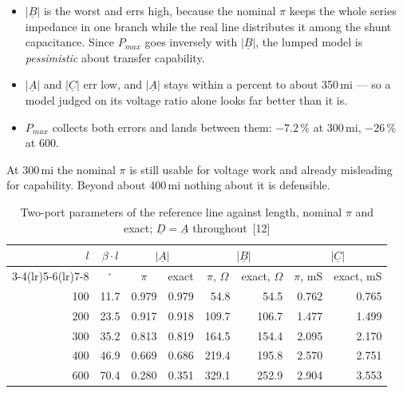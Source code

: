 \begin{itemize}
  \setlength{\itemsep}{0.35em}
  \item $\left|\underline{B}\right|$ is the worst and errs high, because the
        nominal $\pi$ keeps the whole series impedance in one branch while
        the real line distributes it among the shunt capacitance. Since
        $P_{max}$ goes inversely with $\left|\underline{B}\right|$, the
        lumped model is \emph{pessimistic} about transfer capability.
  \item $\left|\underline{A}\right|$ and $\left|\underline{C}\right|$ err
        low, and $\left|\underline{A}\right|$ stays within a percent to
        about 350\,mi --- so a model judged on its voltage ratio alone looks
        far better than it is.
  \item $P_{max}$ collects both errors and lands between them: $-7.2$\,\% at
        300\,mi, $-26$\,\% at 600.
\end{itemize}

At 300\,mi the nominal $\pi$ is still usable for voltage work and already
misleading for capability. Beyond about 400\,mi nothing about it is
defensible.

\begin{table}[!ht]
  \centering
  \begin{tabular}{@{}r r r r r r r r@{}}
    \toprule
    \textbf{$l$} & \multicolumn{1}{c}{\textbf{$\beta \cdot l$}}
      & \multicolumn{2}{c}{$\left|\underline{A}\right|$}
      & \multicolumn{2}{c}{$\left|\underline{B}\right|$}
      & \multicolumn{2}{c}{$\left|\underline{C}\right|$} \\
    \cmidrule(lr){3-4}\cmidrule(lr){5-6}\cmidrule(lr){7-8}
    \multicolumn{1}{c}{mi} & \multicolumn{1}{c}{$^\circ$}
      & \multicolumn{1}{c}{$\pi$} & \multicolumn{1}{c}{exact}
      & \multicolumn{1}{c}{$\pi$, $\Omega$} & \multicolumn{1}{c}{exact, $\Omega$}
      & \multicolumn{1}{c}{$\pi$, mS} & \multicolumn{1}{c}{exact, mS} \\
    \midrule
    100 & 11.7 & 0.979 & 0.979 &  54.8 &  54.5 & 0.762 & 0.765 \\
    200 & 23.5 & 0.917 & 0.918 & 109.7 & 106.7 & 1.477 & 1.499 \\
    300 & 35.2 & 0.813 & 0.819 & 164.5 & 154.4 & 2.095 & 2.170 \\
    400 & 46.9 & 0.669 & 0.686 & 219.4 & 195.8 & 2.570 & 2.751 \\
    600 & 70.4 & 0.280 & 0.351 & 329.1 & 252.9 & 2.904 & 3.553 \\
    \bottomrule
  \end{tabular}
  \caption{Two-port parameters of the reference line against length, nominal
           $\pi$ and exact; $\underline{D} = \underline{A}$ throughout~[12]}
  \label{tab:ref-pi-abs}
\end{table}

